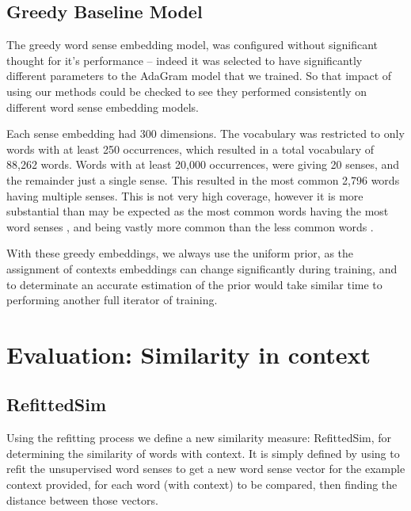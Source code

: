 \documentclass{sig-alternate}
\begin{document}
\subsection{Greedy Baseline Model}
The greedy word sense embedding model, was configured without significant thought for it's performance -- indeed it was selected to have significantly different parameters to the AdaGram model that we trained. So that impact of using our methods could be checked to see they performed consistently on different word sense embedding models.

Each sense embedding had 300 dimensions.
The vocabulary was restricted to only words with at least 250 occurrences, which resulted in a total vocabulary of 88,262 words. Words with at least 20,000 occurrences, were giving 20 senses, and the remainder just a single sense. This resulted in the most common 2,796 words having multiple senses. This is not very high coverage, however it is more substantial than may be expected as the most common words having the most word senses \parencite{zipf1945meaning}, and being vastly more common than the less common words \parencite{zipf1949human,gilmour2005understanding}.

With these greedy embeddings, we always use the uniform prior, as the assignment of contexts embeddings can change significantly during training, and to determinate an accurate estimation of the prior would take similar time to performing another full iterator of training.



\section{Evaluation: Similarity in context} \label{SimilarityInContext}
\subsection{RefittedSim}\label{RefittedSimVsAvgSimC}

Using the refitting process we define a new similarity measure: RefittedSim, for determining the similarity of words with context.
It is simply defined by using  to refit the unsupervised word senses to get a new word sense vector for the example context provided, for each word (with context) to be compared, then finding the distance between those vectors.
\end{document}
